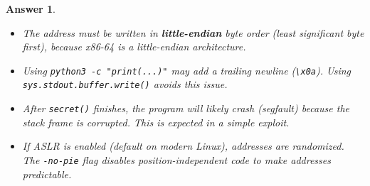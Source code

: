 \documentclass[a4paper,11pt]{article}
\theoremstyle{plain}
\newtheorem{correction}{Answer}
\theoremstyle{definition}
\begin{document}
\begin{correction}
\begin{attention}
\begin{itemize}
\item The address must be written in \textbf{little-endian} byte order (least significant byte first), because x86-64 is a little-endian architecture.
\item Using \texttt{python3 -c "print(...)"} may add a trailing newline (\texttt{\textbackslash x0a}). Using \texttt{sys.stdout.buffer.write()} avoids this issue.
\item After \texttt{secret()} finishes, the program will likely crash (segfault) because the stack frame is corrupted. This is expected in a simple exploit.
\item If ASLR is enabled (default on modern Linux), addresses are randomized. The \texttt{-no-pie} flag disables position-independent code to make addresses predictable.
\end{itemize}
\end{attention}

\end{correction}

\bigskip


\end{document}
